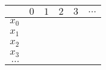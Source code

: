 
\begin{longtable}{|r||r|r|r|r|r|}
\hline 
         & $0$ & $1$ & $2$ & $3$ & $\ldots$ \\ \hline \hline 
$x_0$    &     &     &     &     &          \\ \hline 
$x_1$    &     &     &     &     &          \\ \hline 
$x_2$    &     &     &     &     &          \\ \hline 
$x_3$    &     &     &     &     &          \\ \hline 
$\ldots$ &     &     &     &     &          \\ \hline 
\end{longtable}
        
